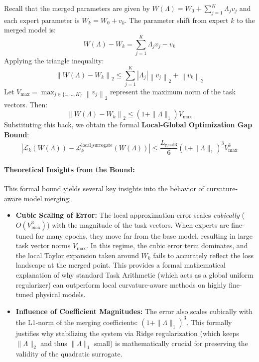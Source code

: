 Recall that the merged parameters are given by $W(\Lambda) = W_0 + \sum_{j=1}^K \Lambda_j v_j$ and each expert parameter is $W_k = W_0 + v_k$. The parameter shift from expert $k$ to the merged model is:
\begin{equation}
    W(\Lambda) - W_k = \sum_{j=1}^K \Lambda_j v_j - v_k
\end{equation}
Applying the triangle inequality:
\begin{equation}
    \left\| W(\Lambda) - W_k \right\|_2 \le \sum_{j=1}^K |\Lambda_j| \left\| v_j \right\|_2 + \left\| v_k \right\|_2
\end{equation}
Let $V_{\max} = \max_{j \in \{1, \dots, K\}} \left\| v_j \right\|_2$ represent the maximum norm of the task vectors. Then:
\begin{equation}
    \left\| W(\Lambda) - W_k \right\|_2 \le \left( 1 + \|\Lambda\|_1 \right) V_{\max}
\end{equation}
Substituting this back, we obtain the formal \textbf{Local-Global Optimization Gap Bound}:
\begin{equation}
    \left| \mathcal{L}_k(W(\Lambda)) - \mathcal{L}_k^{\text{local\_surrogate}}(W(\Lambda)) \right| \le \frac{L_{\text{grad3}}}{6} \left( 1 + \|\Lambda\|_1 \right)^3 V_{\max}^3
\label{eq:local_global_bound}
\end{equation}

\paragraph{Theoretical Insights from the Bound:}
This formal bound yields several key insights into the behavior of curvature-aware model merging:
\begin{itemize}
    \item \textbf{Cubic Scaling of Error:} The local approximation error scales \emph{cubically} ($O(V_{\max}^3)$) with the magnitude of the task vectors. When experts are fine-tuned for many epochs, they move far from the base model, resulting in large task vector norms $V_{\max}$. In this regime, the cubic error term dominates, and the local Taylor expansion taken around $W_k$ fails to accurately reflect the loss landscape at the merged point. This provides a formal mathematical explanation of why standard Task Arithmetic (which acts as a global uniform regularizer) can outperform local curvature-aware methods on highly fine-tuned physical models.
    \item \textbf{Influence of Coefficient Magnitudes:} The error also scales cubically with the L1-norm of the merging coefficients: $(1 + \|\Lambda\|_1)^3$. This formally justifies why stabilizing the system via Ridge regularization (which keeps $\|\Lambda\|_2$ and thus $\|\Lambda\|_1$ small) is mathematically crucial for preserving the validity of the quadratic surrogate.
\end{itemize}

